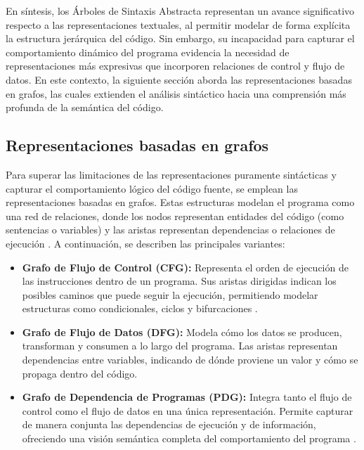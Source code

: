 En síntesis, los Árboles de Sintaxis Abstracta representan un avance significativo respecto a las representaciones textuales, al permitir modelar de forma explícita la estructura jerárquica del código. Sin embargo, su incapacidad para capturar el comportamiento dinámico del programa evidencia la necesidad de representaciones más expresivas que incorporen relaciones de control y flujo de datos. En este contexto, la siguiente sección aborda las representaciones basadas en grafos, las cuales extienden el análisis sintáctico hacia una comprensión más profunda de la semántica del código.

\subsection{Representaciones basadas en grafos}

Para superar las limitaciones de las representaciones puramente sintácticas y capturar el comportamiento lógico del código fuente, se emplean las representaciones basadas en grafos. Estas estructuras modelan el programa como una red de relaciones, donde los nodos representan entidades del código (como sentencias o variables) y las aristas representan dependencias o relaciones de ejecución \cite{Yu2023Graph}. A continuación, se describen las principales variantes:

\begin{itemize}
    \item \textbf{Grafo de Flujo de Control (CFG):} Representa el orden de ejecución de las instrucciones dentro de un programa. Sus aristas dirigidas indican los posibles caminos que puede seguir la ejecución, permitiendo modelar estructuras como condicionales, ciclos y bifurcaciones \cite{Yu2023Graph}.

    \item \textbf{Grafo de Flujo de Datos (DFG):} Modela cómo los datos se producen, transforman y consumen a lo largo del programa. Las aristas representan dependencias entre variables, indicando de dónde proviene un valor y cómo se propaga dentro del código\cite{Guo2021GraphCodeBERT}.

    \item \textbf{Grafo de Dependencia de Programas (PDG):} Integra tanto el flujo de control como el flujo de datos en una única representación. Permite capturar de manera conjunta las dependencias de ejecución y de información, ofreciendo una visión semántica completa del comportamiento del programa \cite{Yu2023Graph}.
\end{itemize}

